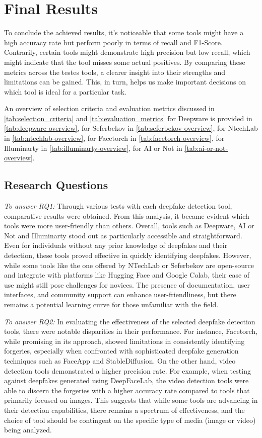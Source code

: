 \section{Final Results}\label{sec:final_results}
To conclude the achieved results, it's noticeable that some tools might have a high accuracy rate
but perform poorly in terms of recall and F1-Score. Contrarily, certain tools might demonstrate
high precision but low recall, which might indicate that the tool misses some actual
positives. By comparing these metrics across the testes tools, a clearer insight into their
strengths and limitations can be gained. This, in turn, helps us make important decisions on
which tool is ideal for a particular task.

An overview of selection criteria and evaluation metrics discussed in \autoref{tab:selection_criteria}
and \autoref{tab:evaluation_metrics} for Deepware is provided in \autoref{tab:deepware-overview}, for Seferbekov in \autoref{tab:seferbekov-overview},
for NtechLab in \autoref{tab:ntechlab-overview}, for Facetorch in \autoref{tab:facetorch-overview},
for Illuminarty in \autoref{tab:illuminarty-overview}, for AI or Not in \autoref{tab:ai-or-not-overview}.

\subsection{Research Questions}
\textit{To answer \ac{RQ}1:} Through various tests with each deepfake detection tool,
comparative results were obtained. From this analysis, it became evident which tools were more
user-friendly than others. Overall, tools such as Deepware, AI or Not and Illuminarty stood out
as particularly accessible and straightforward. Even for individuals without any prior knowledge
of deepfakes and their detection, these tools proved effective in quickly identifying deepfakes.
However, while some tools like the one offered by NTechLab or Seferbekov are open-source and
integrate with platforms like Hugging Face and Google Colab, their ease of use might still pose
challenges for novices. The presence of documentation, user interfaces, and community support
can enhance user-friendliness, but there remains a potential learning curve for those unfamiliar
with the field.

\textit{To answer \ac{RQ}2:} In evaluating the effectiveness of the selected deepfake detection
tools, there were notable disparities in their performance. For instance, Facetorch, while
promising in its approach, showed limitations in consistently identifying forgeries,
especially when confronted with sophisticated deepfake generation techniques such as FaceApp
and StableDiffusion. On the other hand, video detection tools demonstrated a higher precision
rate. For example, when testing against deepfakes generated using DeepFaceLab, the video
detection tools were able to discern the forgeries with a higher accuracy rate compared to
tools that primarily focused on images. This suggests that while some tools are advancing
in their detection capabilities, there remains a spectrum of effectiveness, and the choice
of tool should be contingent on the specific type of media (image or video) being analyzed.

